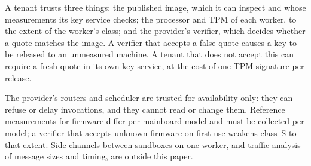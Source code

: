 A tenant trusts three things: the published image, which it can inspect and whose measurements its key service
checks; the processor and TPM of each worker, to the extent of the worker's class; and the provider's verifier, which
decides whether a quote matches the image. A verifier that accepts a false quote causes a key to be released to an
unmeasured machine. A tenant that does not accept this can require a fresh quote in its own key service, at the cost
of one TPM signature per release.

The provider's routers and scheduler are trusted for availability only: they can refuse or delay invocations, and they
cannot read or change them. Reference measurements for firmware differ per mainboard model and must be collected per
model; a verifier that accepts unknown firmware on first use weakens class~S to that extent. Side channels between
sandboxes on one worker, and traffic analysis of message sizes and timing, are outside this paper.
